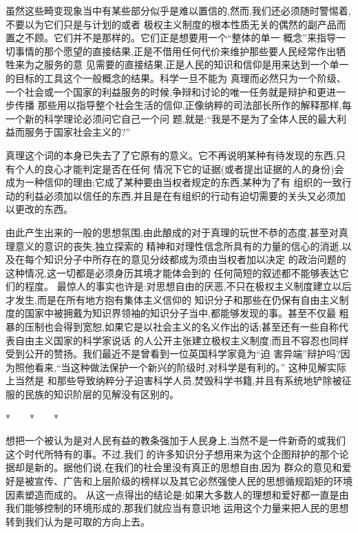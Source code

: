 ﻿\documentclass[12pt]{article}
\begin{document}
虽然这些畸变现象当中有某些部分似乎是难以置信的,然而,我们还必须随时警惕着,不要以为它们只是与计划的或者
极权主义制度的根本性质无关的偶然的副产品而置之不顾。它们并不是那样的。它们正是想要用一个``整体的单一
概念''来指导一切事情的那个愿望的直接结果,正是不借用任何代价来维护那些要人民经常作出牺牲来为之服务的意
见需要的直接结果,正是人民的知识和信仰是用来达到一个单一的目标的工具这个一般概念的结果。科学一旦不能为
真理而必然只为一个阶级、一个社会或一个国家的利益服务的时候,争辩和讨论的唯一任务就是辩护和更进一步传播
那些用以指导整个社会生活的信仰,正像纳粹的司法部长所作的解释那样,每一个新的科学理论必须问它自己一个问
题,就是:``我是不是为了全体人民的最大利益而服务于国家社会主义的?''

真理这个词的本身已失去了了它原有的意义。它不再说明某种有待发现的东西,只有个人的良心才能判定是否在任何
情况下它的证据(或者提出证据的人的身份)会成为一种信仰的理由;它成了某种要由当权者规定的东西,某种为了有
组织的一致行动的利益必须加以信任的东西,并且是在有组织的行动有迫切需要的关头又必须加以更改的东西。

由此产生出来的一般的思想氛围,由此酿成的对于真理的玩世不恭的态度,甚至对真理意义的意识的丧失,独立探索的
精神和对理性信念所具有的力量的信心的消逝,以及在每个知识分子中所存在的意见分歧都成为须由当权者加以决定
的政治问题的这种情况,这一切都是必须身历其境才能体会到的 \myrule 任何简短的叙述都不能够表达它们的程度。
最惊人的事实也许是:对思想自由的厌恶,不只在极权主义制度建立以后才发生,而是在所有地方抱有集体主义信仰的
知识分子和那些在仍保有自由主义制度的国家中被拥戴为知识界领袖的知识分子当中,都能够发现的事。甚至不仅最
粗暴的压制也会得到宽恕,如果它是以社会主义的名义作出的话;甚至还有一些自称代表自由主义国家的科学家说话
的人公开主张建立极权主义制度;而且不容忍也同样受到公开的赞扬。我们最近不是曾看到一位英国科学家竟为``迫
害异端''辩护吗?因为照他看来,``当这种做法保护一个新兴的阶级时,对科学是有利的。'' 这种见解实际上当然是
和那些导致纳粹分子迫害科学人员,焚毁科学书籍,并且有系统地铲除被征服的民族的知识阶层的见解没有区别的。

*　　*　　*

想把一个被认为是对人民有益的教条强加于人民身上,当然不是一件新奇的或我们这个时代所特有的事。不过,我们
的许多知识分子想用来为这个企图辩护的那个论据却是新的。据他们说,在我们的社会里没有真正的思想自由,因为
群众的意见和爱好是被宣传、广告和上层阶级的榜样以及其它必然强使人民的思想循规蹈矩的环境因素塑造而成的。
从这一点得出的结论是:如果大多数人的理想和爱好都一直是由我们能够控制的环境形成的,那我们就应当有意识地
运用这个力量来把人民的思想转到我们认为是可取的方向上去。
\end{document}
